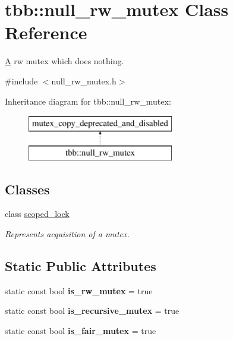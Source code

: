 \hypertarget{classtbb_1_1null__rw__mutex}{}\section{tbb\+:\+:null\+\_\+rw\+\_\+mutex Class Reference}
\label{classtbb_1_1null__rw__mutex}


\hyperlink{structA}{A} rw mutex which does nothing.  




{\ttfamily \#include $<$null\+\_\+rw\+\_\+mutex.\+h$>$}

Inheritance diagram for tbb\+:\+:null\+\_\+rw\+\_\+mutex\+:\begin{figure}[H]
\begin{center}
\leavevmode
\includegraphics[height=2.000000cm]{classtbb_1_1null__rw__mutex}
\end{center}
\end{figure}
\subsection*{Classes}
\begin{DoxyCompactItemize}
\item 
class \hyperlink{classtbb_1_1null__rw__mutex_1_1scoped__lock}{scoped\+\_\+lock}
\begin{DoxyCompactList}\small\item\em Represents acquisition of a mutex. \end{DoxyCompactList}\end{DoxyCompactItemize}
\subsection*{Static Public Attributes}
\begin{DoxyCompactItemize}
\item 
\hypertarget{classtbb_1_1null__rw__mutex_a2a676977ac67532f5f35f849ec7eac8c}{}static const bool {\bfseries is\+\_\+rw\+\_\+mutex} = true\label{classtbb_1_1null__rw__mutex_a2a676977ac67532f5f35f849ec7eac8c}

\item 
\hypertarget{classtbb_1_1null__rw__mutex_ab153992db6e44aee96ce8c1b2d495c94}{}static const bool {\bfseries is\+\_\+recursive\+\_\+mutex} = true\label{classtbb_1_1null__rw__mutex_ab153992db6e44aee96ce8c1b2d495c94}

\item 
\hypertarget{classtbb_1_1null__rw__mutex_ab8500b8a645b1c03221fd1fb4156fa78}{}static const bool {\bfseries is\+\_\+fair\+\_\+mutex} = true\label{classtbb_1_1null__rw__mutex_ab8500b8a645b1c03221fd1fb4156fa78}

\end{DoxyCompactItemize}


